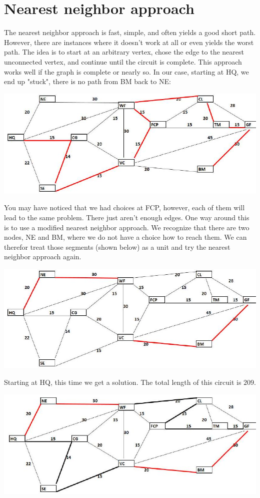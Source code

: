 \documentclass[10pt]{article}
\begin{document}
\section{Nearest neighbor approach}
The nearest neighbor approach is fast, simple, and often yields a good short path. However, there are instances where it doesn't work at all or even yields the worst path. The idea is to start at an arbitrary vertex, chose the edge to the nearest unconnected vertex, and continue until the circuit is complete. This approach works well if the graph is complete or nearly so. In our case, starting at HQ, we end up "stuck", there is no path from BM back to NE:

\includegraphics[max width=\textwidth]{2022_07_05_5945264bba2a5f6ba667g-54}

You may have noticed that we had choices at FCP, however, each of them will lead to the same problem. There just aren't enough edges. One way around this is to use a modified nearest neighbor approach. We recognize that there are two nodes, NE and BM, where we do not have a choice how to reach them. We can therefor treat those segments (shown below) as a unit and try the nearest neighbor approach again.

\includegraphics[max width=\textwidth]{2022_07_05_5945264bba2a5f6ba667g-55}

Starting at HQ, this time we get a solution. The total length of this circuit is $209 .$

\includegraphics[max width=\textwidth]{2022_07_05_5945264bba2a5f6ba667g-55(1)}
\end{document}
